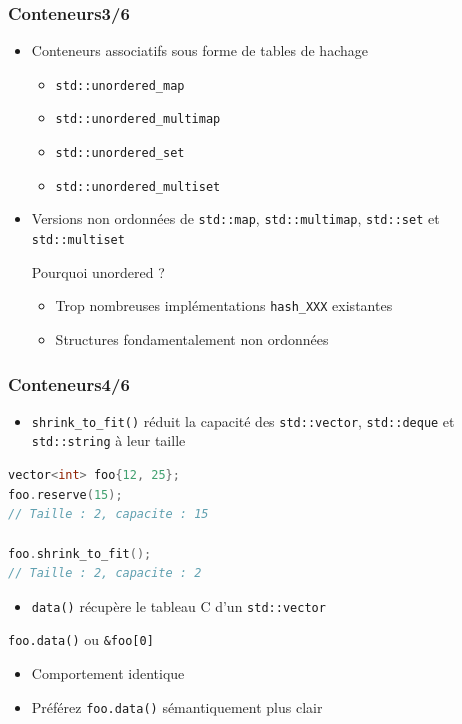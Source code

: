 \documentclass[C++.tex]{subfiles}
\begin{document}
\begin{frame}[fragile]
	\frametitle{Conteneurs\titlehfill{}3/6}
	\begin{itemize}
		\item Conteneurs associatifs sous forme de tables de hachage
		\begin{itemize}
			\item \lstinline|std::unordered_map|
			\item \lstinline|std::unordered_multimap|
			\item \lstinline|std::unordered_set|
			\item \lstinline|std::unordered_multiset|
		\end{itemize}
		\item Versions non ordonnées de \lstinline|std::map|, \lstinline|std::multimap|, \lstinline|std::set| et \lstinline|std::multiset|

		\begin{block}{Pourquoi unordered ?}
			\begin{itemize}
				\item Trop nombreuses implémentations \lstinline|hash_XXX| existantes
				\item Structures fondamentalement non ordonnées
			\end{itemize}
		\end{block}
	\end{itemize}
\end{frame}

\begin{frame}[fragile]
	\frametitle{Conteneurs\titlehfill{}4/6}
	\begin{itemize}
		\item \lstinline|shrink_to_fit()| réduit la capacité des \lstinline|std::vector|, \lstinline|std::deque| et \lstinline|std::string| à leur taille
	\end{itemize}


	\begin{lstlisting}[language=C++]
vector<int> foo{12, 25};
foo.reserve(15);
// Taille : 2, capacite : 15

foo.shrink_to_fit();
// Taille : 2, capacite : 2\end{lstlisting}

	\begin{itemize}
		\item \lstinline|data()| récupère le \og tableau C\fg{} d'un \lstinline|std::vector|
	\end{itemize}

	\begin{block}{\lstinline|foo.data()| ou \lstinline|&foo[0]|}
		\begin{itemize}
			\item Comportement identique
			\item Préférez \lstinline|foo.data()| sémantiquement plus clair
		\end{itemize}
	\end{block}
\end{frame}
\end{document}
